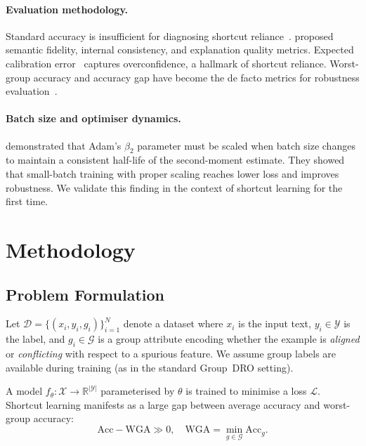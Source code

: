 \documentclass[10pt,twocolumn]{article}
\newcommand{\wga}{\mathrm{WGA}}
\newcommand{\loss}{\mathcal{L}}
\newcommand{\RR}{\mathbb{R}}
\begin{document}
\paragraph{Evaluation methodology.}
Standard accuracy is insufficient for diagnosing shortcut
reliance~\citep{sagawa2020distributionally}.
\citet{yuan2024revisiting} proposed semantic fidelity,
internal consistency, and explanation quality metrics.
Expected calibration error~\citep{guo2017calibration,naeini2015obtaining}
captures overconfidence, a hallmark of shortcut reliance.
Worst-group accuracy and accuracy gap have become the
de facto metrics for robustness
evaluation~\citep{sagawa2020distributionally,liu2021just}.

\paragraph{Batch size and optimiser dynamics.}
\citet{marek2025scaling} demonstrated that Adam's $\beta_2$
parameter must be scaled when batch size changes to maintain
a consistent half-life of the second-moment estimate.
They showed that small-batch training with proper scaling
reaches lower loss and improves robustness.  We validate this
finding in the context of shortcut learning for the first time.

\section{Methodology}
\label{sec:method}

\subsection{Problem Formulation}
\label{subsec:formulation}

Let $\mathcal{D} = \{(x_i, y_i, g_i)\}_{i=1}^N$ denote a
dataset where $x_i$ is the input text, $y_i \in \mathcal{Y}$
is the label, and $g_i \in \mathcal{G}$ is a group attribute
encoding whether the  example is \emph{aligned} or
\emph{conflicting} with respect to a spurious feature.
We assume group labels are available during training (as in
the standard Group~DRO setting).

A model $f_\theta: \mathcal{X} \to \RR^{|\mathcal{Y}|}$
parameterised by $\theta$ is trained to minimise a loss
$\loss$.
Shortcut learning manifests as a large gap between average
accuracy and worst-group accuracy:
\begin{equation}
  \text{Acc} - \wga \gg 0,\quad
  \wga = \min_{g \in \mathcal{G}} \text{Acc}_g.
  \label{eq:wga}
\end{equation}
\end{document}
